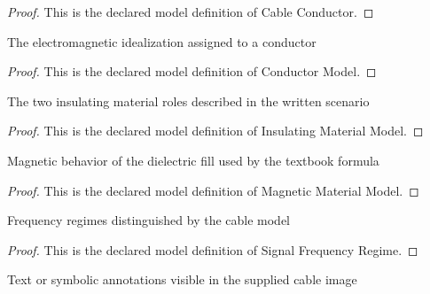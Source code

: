 \begin{proof}
  This is the declared model definition of Cable Conductor.
\end{proof}
\begin{definition}
  \label{def:physics:phyx-mini-0885:phyxminiproblems-problemphyxmini0885-conductormodel}
  The electromagnetic idealization assigned to a conductor
\end{definition}
\begin{proof}
  This is the declared model definition of Conductor Model.
\end{proof}
\begin{definition}
  \label{def:physics:phyx-mini-0885:phyxminiproblems-problemphyxmini0885-insulatingmaterialmodel}
  The two insulating material roles described in the written scenario
\end{definition}
\begin{proof}
  This is the declared model definition of Insulating Material Model.
\end{proof}
\begin{definition}
  \label{def:physics:phyx-mini-0885:phyxminiproblems-problemphyxmini0885-magneticmaterialmodel}
  Magnetic behavior of the dielectric fill used by the textbook formula
\end{definition}
\begin{proof}
  This is the declared model definition of Magnetic Material Model.
\end{proof}
\begin{definition}
  \label{def:physics:phyx-mini-0885:phyxminiproblems-problemphyxmini0885-signalfrequencyregime}
  Frequency regimes distinguished by the cable model
\end{definition}
\begin{proof}
  This is the declared model definition of Signal Frequency Regime.
\end{proof}
\begin{definition}
  \label{def:physics:phyx-mini-0885:phyxminiproblems-problemphyxmini0885-figurelabel}
  Text or symbolic annotations visible in the supplied cable image
\end{definition}
